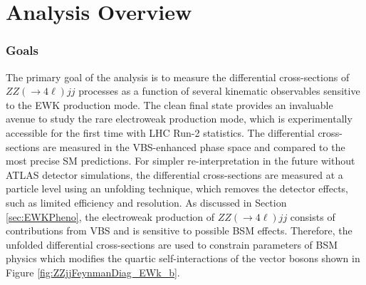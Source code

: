 \part {\LARGE{Analysis Overview}}
\label{sec:AnalysisOverview}

\section{Goals}
\label{sec:Analysis_Goals}

The primary goal of the analysis is to measure the differential cross-sections of $ZZ ( \rightarrow 4\ell) jj$ processes as a function of several kinematic observables sensitive to the EWK production mode. The clean final state provides an invaluable avenue to study the rare electroweak production mode, which is experimentally accessible for the first time with LHC Run-2 statistics. The differential cross-sections are measured in the VBS-enhanced phase space and compared to the most precise SM predictions. For simpler re-interpretation in the future without ATLAS detector simulations, the differential cross-sections are measured at a particle level using an unfolding technique, which removes the detector effects, such as limited efficiency and resolution. As discussed in Section \ref{sec:EWKPheno}, the electroweak production of $ZZ ( \rightarrow 4\ell) jj$ consists of contributions from VBS and is sensitive to possible BSM effects. Therefore, the unfolded differential cross-sections are used to constrain parameters of BSM physics which modifies the quartic self-interactions of the vector bosons shown in Figure \ref{fig:ZZjjFeynmanDiag_EWk_b}.